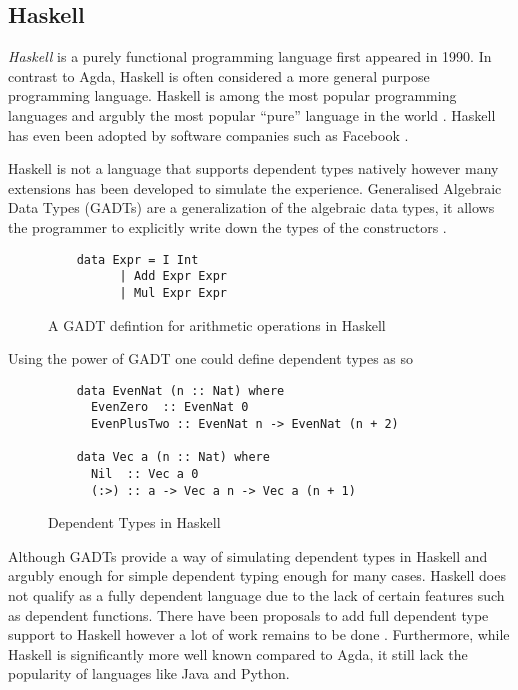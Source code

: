 \documentclass[a4paper,12pt]{report}
\begin{document}
\subsection{Haskell}
\textit{Haskell} \cite{haskell} is a purely functional programming language first appeared in 1990. In 
contrast to Agda, Haskell is often considered a more general purpose programming 
language. Haskell is among the most popular programming languages and argubly 
the most popular ``pure'' language in the world \cite{pypl}. 
Haskell has even been adopted by software companies such as Facebook \cite{haskellFB}.

\par
Haskell is not a language that supports dependent types natively however many 
extensions has been developed to simulate the experience. 
Generalised Algebraic Data Types (GADTs) are a generalization of the 
algebraic data types, it allows the programmer to 
explicitly write down the types of the constructors \cite{haskellGADT}. 
\begin{figure}[H]
  \begin{lstlisting}
    data Expr = I Int        
          | Add Expr Expr 
          | Mul Expr Expr 
  \end{lstlisting}
  \caption{A GADT defintion for arithmetic operations in Haskell}
\end{figure}

Using the power of GADT one could define dependent types as so

\begin{figure}[H]
  \begin{lstlisting}      
    data EvenNat (n :: Nat) where
      EvenZero  :: EvenNat 0
      EvenPlusTwo :: EvenNat n -> EvenNat (n + 2)
      
    data Vec a (n :: Nat) where
      Nil  :: Vec a 0
      (:>) :: a -> Vec a n -> Vec a (n + 1)
  \end{lstlisting}
  \caption{Dependent Types in Haskell}
\end{figure}

\par
Although GADTs provide a way of simulating dependent types in Haskell and 
argubly enough for simple dependent typing enough for many cases. 
Haskell does not qualify as a fully dependent 
language due to the lack of certain features such as dependent functions. There 
have been proposals to add full dependent type support to Haskell however a lot 
of work remains to be done \cite{dependentHaskell, aRoleForDependentHaskell}. 
Furthermore, while Haskell is significantly more well known compared to Agda, it 
still lack the popularity of languages like Java and Python.
\end{document}
